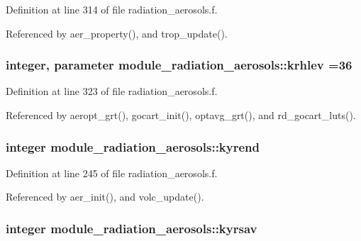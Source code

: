 Definition at line 314 of file radiation\+\_\+aerosols.\+f.



Referenced by aer\+\_\+property(), and trop\+\_\+update().

\subsubsection[{\texorpdfstring{krhlev}{krhlev}}]{\setlength{\rightskip}{0pt plus 5cm}integer, parameter module\+\_\+radiation\+\_\+aerosols\+::krhlev =36\hspace{0.3cm}{\ttfamily [private]}}\hypertarget{namespacemodule__radiation__aerosols_a33f2d4489a1730a27cbdc2e2add0f977}{}\label{namespacemodule__radiation__aerosols_a33f2d4489a1730a27cbdc2e2add0f977}


Definition at line 323 of file radiation\+\_\+aerosols.\+f.



Referenced by aeropt\+\_\+grt(), gocart\+\_\+init(), optavg\+\_\+grt(), and rd\+\_\+gocart\+\_\+luts().

\subsubsection[{\texorpdfstring{kyrend}{kyrend}}]{\setlength{\rightskip}{0pt plus 5cm}integer module\+\_\+radiation\+\_\+aerosols\+::kyrend\hspace{0.3cm}{\ttfamily [private]}}\hypertarget{namespacemodule__radiation__aerosols_a79127786cce93bccf8749ef8c85f6467}{}\label{namespacemodule__radiation__aerosols_a79127786cce93bccf8749ef8c85f6467}


Definition at line 245 of file radiation\+\_\+aerosols.\+f.



Referenced by aer\+\_\+init(), and volc\+\_\+update().

\subsubsection[{\texorpdfstring{kyrsav}{kyrsav}}]{\setlength{\rightskip}{0pt plus 5cm}integer module\+\_\+radiation\+\_\+aerosols\+::kyrsav\hspace{0.3cm}{\ttfamily [private]}}\hypertarget{namespacemodule__radiation__aerosols_a928c08857f866e4b848873a23a1d49e7}{}\label{namespacemodule__radiation__aerosols_a928c08857f866e4b848873a23a1d49e7}


